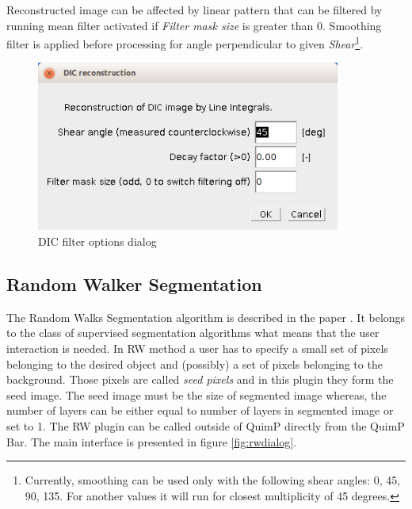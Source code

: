 \documentclass[a4paper,12pt]{article}
\begin{document}
Reconstructed image can be affected by linear pattern that can be filtered by running mean filter activated if \textit{Filter mask size} is greater than 0. Smoothing filter is applied before processing for angle perpendicular to given \textit{Shear}\footnote{Currently, smoothing can be used only with the following shear angles: 0, 45, 90, 135. For another values it will run for closest multiplicity of 45 degrees.}.    
   
\begin{figure}[ht]
	\centering
	\includegraphics[width=10cm]{DICwindow.png} 
	\caption{DIC filter options dialog}
	\label{fig:dicdialog}
\end{figure} 

\subsection{Random Walker Segmentation}
\label{sec:RWSeg}

The Random Walks Segmentation algorithm is described in the paper \cite{Grady2006}. It belongs to the class of supervised segmentation algorithms what means that the user interaction is needed. In RW method a user has to specify a small set of pixels belonging to the desired object and
(possibly) a set of pixels belonging to the background. Those pixels are called \textit{seed pixels} and in this plugin they form the seed image. The seed image must be the size of segmented image whereas, the number of layers can be either equal to number of layers in segmented image or set to 1. The RW plugin can be called outside of QuimP directly from the QuimP Bar. The main interface is presented in figure \ref{fig:rwdialog}.
\end{document}

